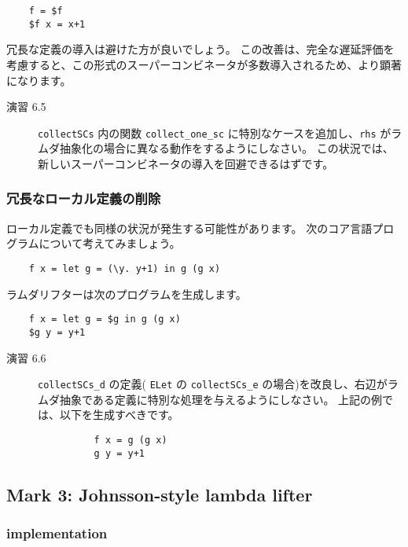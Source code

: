 \documentclass{jarticle}
\begin{document}
\begin{verbatim}
    f = $f
    $f x = x+1
\end{verbatim}

冗長な定義の導入は避けた方が良いでしょう。
この改善は、完全な遅延評価を考慮すると、この形式のスーパーコンビネータが多数導入されるため、より顕著になります。

\begin{description}
	\item[演習 6.5] \texttt{collectSCs} 内の関数 \texttt{collect\_one\_sc} に特別なケースを追加し、\texttt{rhs} がラムダ抽象化の場合に異なる動作をするようにしなさい。
		この状況では、新しいスーパーコンビネータの導入を回避できるはずです。
\end{description}

\subsubsection{冗長なローカル定義の削除}

ローカル定義でも同様の状況が発生する可能性があります。
次のコア言語プログラムについて考えてみましょう。

\begin{verbatim}
    f x = let g = (\y. y+1) in g (g x)
\end{verbatim}

ラムダリフターは次のプログラムを生成します。

\begin{verbatim}
    f x = let g = $g in g (g x)
    $g y = y+1
\end{verbatim}

\begin{description}
	\item[演習 6.6] \texttt{collectSCs\_d} の定義( \texttt{ELet} の \texttt{collectSCs\_e} の場合)を改良し、右辺がラムダ抽象である定義に特別な処理を与えるようにしなさい。
		上記の例では、以下を生成すべきです。
		\begin{verbatim}
		  f x = g (g x)
		  g y = y+1
		\end{verbatim}
\end{description}
\newpage

\subsection{Mark 3: Johnsson-style lambda lifter}
\subsubsection{implementation}
\end{document}
